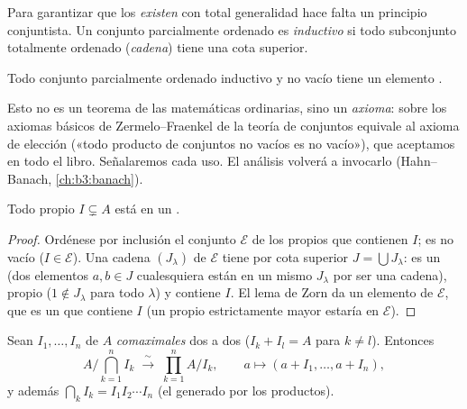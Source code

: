 Para garantizar que los  \emph{existen} con total generalidad hace falta un principio
conjuntista. Un conjunto parcialmente ordenado es \emph{inductivo} si
todo subconjunto totalmente ordenado (\emph{cadena}) tiene una cota
superior.

\begin{theorem}\label{thm:b3:rings:zorn}
Todo conjunto parcialmente ordenado inductivo y no vacío tiene un
elemento .
\admitted
\end{theorem}

\begin{remark}\label{rem:b3:rings:zorn}
Esto no es un teorema de las matemáticas ordinarias, sino un
\emph{axioma}: sobre los axiomas básicos de Zermelo--Fraenkel de la
teoría de conjuntos equivale al axioma de elección («todo producto de
conjuntos no vacíos es no vacío»), que aceptamos en todo el libro.
Señalaremos cada uso. El análisis volverá a invocarlo (Hahn--Banach,
\cref{ch:b3:banach}).
\end{remark}

\begin{theorem}[Krull]\label{thm:b3:rings:krull}
Todo  propio $I \subsetneq A$ está
 en un .
\end{theorem}

\begin{proof}
Ordénese por inclusión el conjunto $\mathcal E$ de los
 propios que contienen $I$; es no
vacío ($I \in \mathcal E$). Una cadena $(J_\lambda)$ de $\mathcal E$
tiene por cota superior $J = \bigcup
J_\lambda$: es un  (dos elementos
$a, b \in J$ cualesquiera están en un mismo $J_\lambda$ por ser una
cadena), propio ($1 \notin J_\lambda$ para todo $\lambda$) y contiene
$I$. El lema de Zorn da un elemento
 de $\mathcal
E$, que es un  que
contiene $I$ (un  propio estrictamente
mayor estaría en $\mathcal E$).
\end{proof}

\begin{theorem}\label{thm:b3:rings:crt}
Sean $I_1, \dots, I_n$  de $A$
\emph{comaximales} dos a dos ($I_k + I_l = A$
para $k \neq l$). Entonces
\[
A\Big/\bigcap_{k=1}^n I_k \;\xrightarrow{\;\sim\;}\;
\prod_{k=1}^n A/I_k,
\qquad
a \longmapsto (a + I_1, \dots, a + I_n),
\]
y además $\bigcap_k I_k = I_1 I_2 \cdots I_n$ (el
 generado por los
productos).
\end{theorem}

